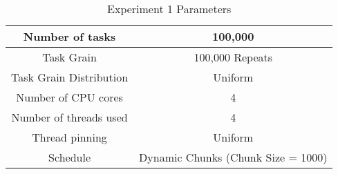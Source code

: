 \begin{table}
\centering
 \begin{tabular}{|c|c|}
  \hline
  Number of tasks & 100,000 \\
  \hline
  Task Grain & 100,000 Repeats \\
  \hline
  Task Grain Distribution & Uniform \\
  \hline
  Number of CPU cores & 4 \\
  \hline
  Number of threads used & 4 \\
  \hline
  Thread pinning & Uniform \\
  \hline
  Schedule & Dynamic Chunks (Chunk Size = 1000) \\
  \hline
 \end{tabular}
\caption{Experiment 1 Parameters}
\iflabela
\label{table:evaluation_ex1_parameters}
\fi
{}
\end{table}
